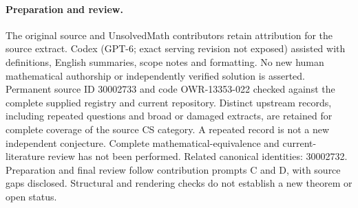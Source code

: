\documentclass[11pt]{article}
\begin{document}
\paragraph{Preparation and review.}
The original source and UnsolvedMath contributors retain attribution for the source extract. Codex (GPT-6; exact serving revision not exposed) assisted with definitions, English summaries, scope notes and formatting. No new human mathematical authorship or independently verified solution is asserted. Permanent source ID 30002733 and code OWR-13353-022 checked against the complete supplied registry and current repository. Distinct upstream records, including repeated questions and broad or damaged extracts, are retained for complete coverage of the source CS category. A repeated record is not a new independent conjecture. Complete mathematical-equivalence and current-literature review has not been performed. Related canonical identities: 30002732. Preparation and final review follow contribution prompts C and D, with source gaps disclosed. Structural and rendering checks do not establish a new theorem or open status.
\label{end:30002733}
\end{document}

